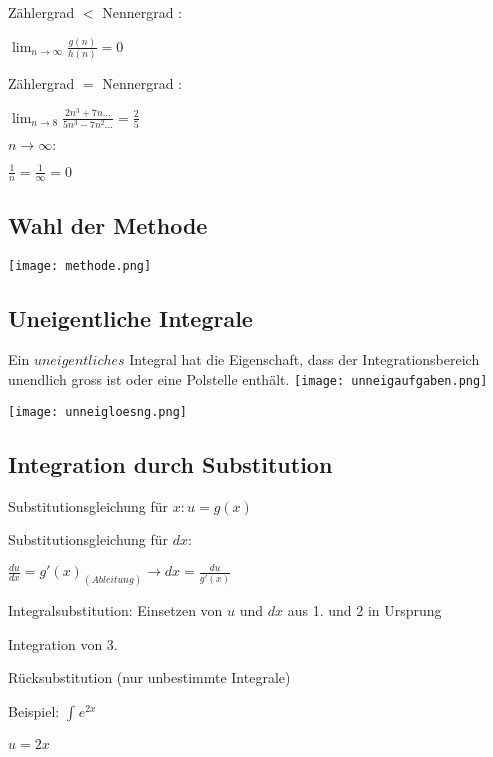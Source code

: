 \begin{multicols*}{3}
    {Zählergrad $<$ Nennergrad : }

    { \large $ \lim_{n\to \infty} \frac{g(n)}{h(n)} = 0$}
    \WhiteSpace

    {Zählergrad $=$ Nennergrad : }

    {\large $  \lim_{n\to 8} \frac{2n^3+7n...}{5n^3-7n^2...} = \frac{2}{5}$}
    \WhiteSpace

    {$n \to \infty:$}

    {\large  $ \frac{1}{n} = \frac{1}{\infty} = 0$}
    \WhiteSpace




    \subsection{Wahl der Methode}

    \texttt{[image: methode.png]}

    \subsection{Uneigentliche Integrale}
    { Ein $uneigentliches$ Integral hat die Eigenschaft, dass der Integrationsbereich unendlich gross
        ist oder eine Polstelle enthält.}
    \texttt{[image: unneigaufgaben.png]}

    \texttt{[image: unneigloesng.png]}



    \vfill\null
    \columnbreak
    \subsection{Integration durch Substitution}
    { Substitutionsgleichung für $x: u = g(x)$}

    { Substitutionsgleichung für $dx:$}

    $ \frac{du}{dx} = g'(x)_{(Ableitung)} \to dx = \frac{du}{g'(x)}$

    { Integralsubstitution: Einsetzen von $ u $ und $ dx $ aus 1. und 2 in Ursprung}

        { Integration von 3.}

        { Rücksubstitution (nur unbestimmte Integrale)}


    \begin{multicols*}{2}
        {Beispiel:}
        $\int_{}^{}e^{2x} $

        \columnbreak

        { $ u = 2x $}


\end{multicols*}
\end{multicols*}
